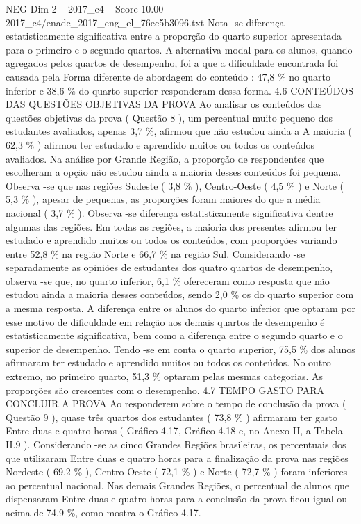 \begin{textsample}{NEG Dim 2 – 2017\_c4 – Score 10.00 – 2017\_c4/enade\_2017\_eng\_el\_76ec5b3096.txt}
Nota -se diferença estatisticamente significativa entre a proporção do quarto superior apresentada para o primeiro e o segundo quartos.
A alternativa modal para os alunos, quando agregados pelos quartos de desempenho, foi a que a dificuldade encontrada foi causada pela Forma diferente de abordagem do conteúdo : 47,8 \% no quarto inferior e 38,6 \% do quarto superior responderam dessa forma. 4.6 CONTEÚDOS DAS QUESTÕES OBJETIVAS DA PROVA Ao analisar os conteúdos das questões objetivas da prova ( Questão 8 ), um percentual muito pequeno dos estudantes avaliados, apenas 3,7 \%, afirmou que não estudou ainda a A maioria ( 62,3 \% ) afirmou ter estudado e aprendido muitos ou todos os conteúdos avaliados.
Na análise por Grande Região, a proporção de respondentes que escolheram a opção não estudou ainda a maioria desses conteúdos foi pequena.
Observa -se que nas regiões Sudeste ( 3,8 \% ), Centro-Oeste ( 4,5 \% ) e Norte ( 5,3 \% ), apesar de pequenas, as proporções foram maiores do que a média nacional ( 3,7 \% ).
Observa -se diferença estatisticamente significativa dentre algumas das regiões.
Em todas as regiões, a maioria dos presentes afirmou ter estudado e aprendido muitos ou todos os conteúdos, com proporções variando entre 52,8 \% na região Norte e 66,7 \% na região Sul.
Considerando -se separadamente as opiniões de estudantes dos quatro quartos de desempenho, observa -se que, no quarto inferior, 6,1 \% ofereceram como resposta que não estudou ainda a maioria desses conteúdos, sendo 2,0 \% os do quarto superior com a mesma resposta.
A diferença entre os alunos do quarto inferior que optaram por esse motivo de dificuldade em relação aos demais quartos de desempenho é estatisticamente significativa, bem como a diferença entre o segundo quarto e o superior de desempenho.
Tendo -se em conta o quarto superior, 75,5 \% dos alunos afirmaram ter estudado e aprendido muitos ou todos os conteúdos.
No outro extremo, no primeiro quarto, 51,3 \% optaram pelas mesmas categorias.
As proporções são crescentes com o desempenho. 4.7 TEMPO GASTO PARA CONCLUIR A PROVA Ao responderem sobre o tempo de conclusão da prova ( Questão 9 ), quase três quartos dos estudantes ( 73,8 \% ) afirmaram ter gasto Entre duas e quatro horas ( Gráfico 4.17, Gráfico 4.18 e, no Anexo II, a Tabela II.9 ).
Considerando -se as cinco Grandes Regiões brasileiras, os percentuais dos que utilizaram Entre duas e quatro horas para a finalização da prova nas regiões Nordeste ( 69,2 \% ), Centro-Oeste ( 72,1 \% ) e Norte ( 72,7 \% ) foram inferiores ao percentual nacional.
Nas demais Grandes Regiões, o percentual de alunos que dispensaram Entre duas e quatro horas para a conclusão da prova ficou igual ou acima de 74,9 \%, como mostra o Gráfico 4.17.

\end{textsample}
